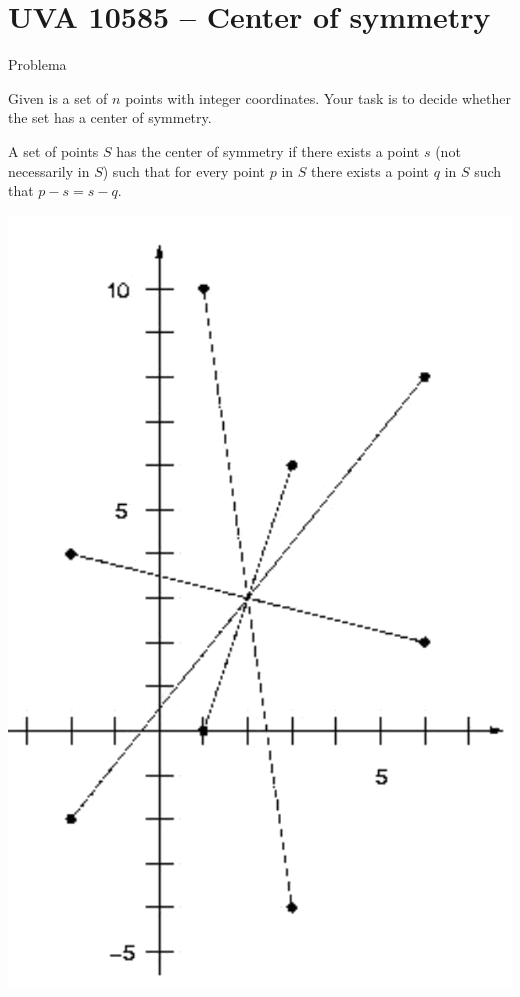 \section{UVA 10585 -- Center of symmetry}

\begin{frame}[fragile]{Problema}

\begin{minipage}{0.45\textwidth}
Given is a set of $n$ points with integer coordinates. Your task is to decide whether the set
has a center of symmetry.

A set of points $S$ has the center of symmetry if there exists a point $s$ (not necessarily in $S$)
such that for every point $p$ in $S$ there exists a point $q$ in $S$ such that $p - s = s - q$.
\end{minipage}
\begin{minipage}{0.5\textwidth}
\begin{center}
\includegraphics[scale=0.5]{figure.png}
\end{center}
\end{minipage}

\end{frame}

